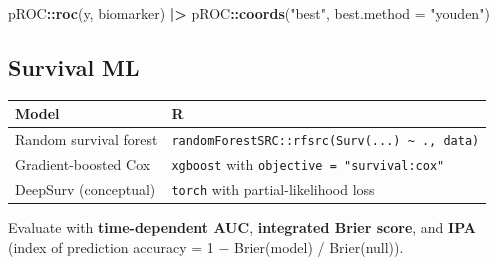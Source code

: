 \documentclass[
]{article}
\newenvironment{Shaded}{\begin{snugshade}}{\end{snugshade}}
\newcommand{\AttributeTok}[1]{\textcolor[rgb]{0.13,0.29,0.53}{#1}}
\newcommand{\DecValTok}[1]{\textcolor[rgb]{0.00,0.00,0.81}{#1}}
\newcommand{\FunctionTok}[1]{\textcolor[rgb]{0.13,0.29,0.53}{\textbf{#1}}}
\newcommand{\NormalTok}[1]{#1}
\newcommand{\OtherTok}[1]{\textcolor[rgb]{0.56,0.35,0.01}{#1}}
\newcommand{\SpecialCharTok}[1]{\textcolor[rgb]{0.81,0.36,0.00}{\textbf{#1}}}
\newcommand{\StringTok}[1]{\textcolor[rgb]{0.31,0.60,0.02}{#1}}
\newcounter{none} %
\begin{document}
\begin{Shaded}
\begin{Highlighting}[]
\NormalTok{pROC}\SpecialCharTok{::}\FunctionTok{roc}\NormalTok{(y, biomarker) }\SpecialCharTok{|\textgreater{}}
\NormalTok{  pROC}\SpecialCharTok{::}\FunctionTok{coords}\NormalTok{(}\StringTok{"best"}\NormalTok{, }\AttributeTok{best.method =} \StringTok{"youden"}\NormalTok{)}
\end{Highlighting}
\end{Shaded}

\subsection{Survival ML}\label{survival-ml}

{\def\LTcaptype{none} %
\begin{longtable}[]{@{}
  >{\raggedright\arraybackslash}p{}
  >{\raggedright\arraybackslash}p{}@{}}
\toprule\noalign{}
\begin{minipage}[b]{\linewidth}\raggedright
Model
\end{minipage} & \begin{minipage}[b]{\linewidth}\raggedright
R
\end{minipage} \\
\midrule\noalign{}
\endhead
\bottomrule\noalign{}
\endlastfoot
Random survival forest &
\texttt{randomForestSRC::rfsrc(Surv(...)\ \textasciitilde{}\ .,\ data)} \\
Gradient-boosted Cox & \texttt{xgboost} with
\texttt{objective\ =\ "survival:cox"} \\
DeepSurv (conceptual) & \texttt{torch} with partial-likelihood loss \\
\end{longtable}
}

Evaluate with \textbf{time-dependent AUC}, \textbf{integrated Brier
score}, and \textbf{IPA} (index of prediction accuracy = 1 −
Brier(model) / Brier(null)).

\begin{Shaded}
\end{Shaded}
\end{document}
